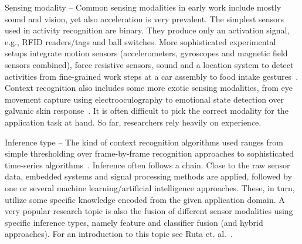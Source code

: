 \begin{description}
\item{Sensing modality} -- %
Common sensing modalities in early work include
mostly sound and vision, yet also acceleration is very prevalent. 
The simplest sensors used in activity recognition are binary. They produce
only an activation signal, e.g., RFID readers/tags and ball switches.
More sophisticated experimental setups integrate
motion sensors (accelerometers, gyroscopes and magnetic field sensors
combined), force resistive sensors, sound and a location system to detect
activities from fine-grained work steps at a car assembly to 
food intake gestures~\cite{Ogris:2008p7906,Amft:2009ir}. 
Context recognition also includes some more exotic sensing modalities,
from eye movement capture using electrooculography to emotional state
detection over galvanic skin response~\cite{Bulling:2008dz,Westeyn:2006ik}. 
It is often difficult to pick the correct modality for the application task at hand. 
So far, researchers rely heavily on experience.
\item{Inference type} -- The kind of context recognition algorithms used ranges from
simple thresholding over frame-by-frame recognition approaches
to sophisticated time-series algorithms~\cite{bao2003physical,Ogris:2008p7906}. 
Inference often follows
a chain. Close to the raw sensor data, embedded systems and signal processing
methods are applied, followed by one or several machine learning/artificial
intelligence approaches. These, in turn, utilize some specific knowledge
encoded from the given application domain. A very popular research topic is also the 
fusion of different sensor modalities using specific inference types, namely feature and classifier fusion (and hybrid approaches). For an introduction to this topic see Ruta et. al.~\cite{ruta-overview}.
\end{description}

